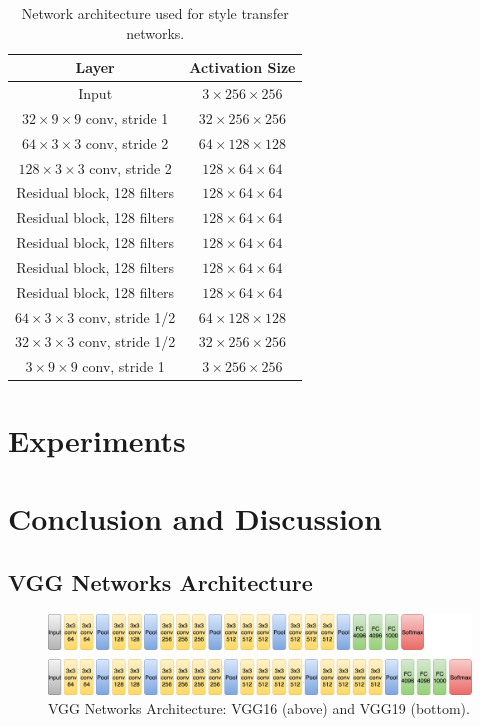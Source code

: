 \documentclass{article} %
\begin{document}
\begin{table}[h]
\caption{Network architecture used for style transfer networks.}
\label{transform}
\centering
\begin{tabular}{|c|c|}

\hline
\textbf{Layer}&\textbf{Activation Size}\\
\hline
Input & $3\times256\times256$\\
$32\times9\times9$ conv, stride 1 & $32\times256\times256$\\
$64\times3\times3$ conv, stride 2&$64\times128\times128$\\
$128\times3\times3$ conv, stride 2& $128\times64\times64$\\
Residual block, 128 filters&$128\times64\times64$\\
Residual block, 128 filters&$128\times64\times64$\\
Residual block, 128 filters&$128\times64\times64$\\
Residual block, 128 filters&$128\times64\times64$\\
Residual block, 128 filters&$128\times64\times64$\\
$64\times3\times3$ conv, stride 1/2&$64\times128\times128$\\
$32\times3\times3$ conv, stride 1/2&$32\times256\times256$\\
$3\times9\times9$ conv, stride 1&$3\times256\times256$\\

\hline

\end{tabular}
\end{table}


\section{Experiments}
\label{exp}





\section{Conclusion and Discussion}




\newpage
\begin{appendix}
\section{VGG Networks Architecture}
\begin{figure}[ht]
\includegraphics[scale=0.3]{VGG.png}
\caption{VGG Networks Architecture: VGG16 (above) and VGG19 (bottom).}
\label{vgg}
\end{figure}

\end{appendix}
\end{document}
